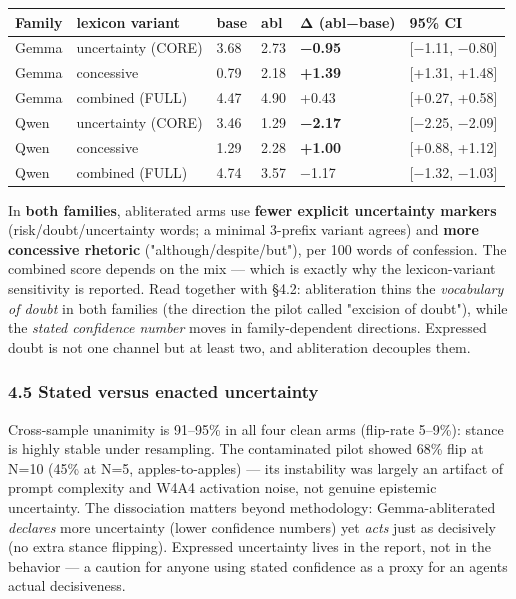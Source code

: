 \documentclass[
  10pt,
]{article}
\newcounter{none} %
\begin{document}
{\def\LTcaptype{none} %
\begin{longtable}[]{@{}llllll@{}}
\toprule\noalign{}
Family & lexicon variant & base & abl & Δ (abl−base) & 95\% CI \\
\midrule\noalign{}
\endhead
\bottomrule\noalign{}
\endlastfoot
Gemma & uncertainty (CORE) & 3.68 & 2.73 & \textbf{−0.95} & {[}−1.11,
−0.80{]} \\
Gemma & concessive & 0.79 & 2.18 & \textbf{+1.39} & {[}+1.31,
+1.48{]} \\
Gemma & combined (FULL) & 4.47 & 4.90 & +0.43 & {[}+0.27, +0.58{]} \\
Qwen & uncertainty (CORE) & 3.46 & 1.29 & \textbf{−2.17} & {[}−2.25,
−2.09{]} \\
Qwen & concessive & 1.29 & 2.28 & \textbf{+1.00} & {[}+0.88, +1.12{]} \\
Qwen & combined (FULL) & 4.74 & 3.57 & −1.17 & {[}−1.32, −1.03{]} \\
\end{longtable}
}

In \textbf{both families}, abliterated arms use \textbf{fewer explicit
uncertainty markers} (risk/doubt/uncertainty words; a minimal 3-prefix
variant agrees) and \textbf{more concessive rhetoric}
("although/despite/but"), per 100 words of confession. The combined
score depends on the mix --- which is exactly why the lexicon-variant
sensitivity is reported. Read together with §4.2: abliteration thins the
\emph{vocabulary of doubt} in both families (the direction the pilot
called "excision of doubt"), while the \emph{stated confidence number}
moves in family-dependent directions. Expressed doubt is not one channel
but at least two, and abliteration decouples them.

\subsubsection{4.5 Stated versus enacted
uncertainty}\label{45-stated-versus-enacted-uncertainty}

Cross-sample unanimity is 91--95\% in all four clean arms (flip-rate
5--9\%): stance is highly stable under resampling. The contaminated
pilot showed 68\% flip at N=10 (45\% at N=5, apples-to-apples) --- its
instability was largely an artifact of prompt complexity and W4A4
activation noise, not genuine epistemic uncertainty. The dissociation
matters beyond methodology: Gemma-abliterated \emph{declares} more
uncertainty (lower confidence numbers) yet \emph{acts} just as
decisively (no extra stance flipping). Expressed uncertainty lives in
the report, not in the behavior --- a caution for anyone using stated
confidence as a proxy for an agent\textquotesingle s actual
decisiveness.
\end{document}
